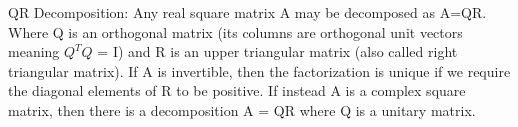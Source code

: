 \documentclass[12pt]{article}
\begin{document}
QR Decomposition: Any real square matrix A may be decomposed as A=QR. 
Where Q is an orthogonal matrix (its columns are orthogonal unit vectors meaning $Q^{T}Q$ = I) and R is an upper triangular matrix (also called right triangular matrix). 
If A is invertible, then the factorization is unique if we require the diagonal elements of R to be positive.
If instead A is a complex square matrix, then there is a decomposition A = QR where Q is a unitary matrix.
  

\end{document}
